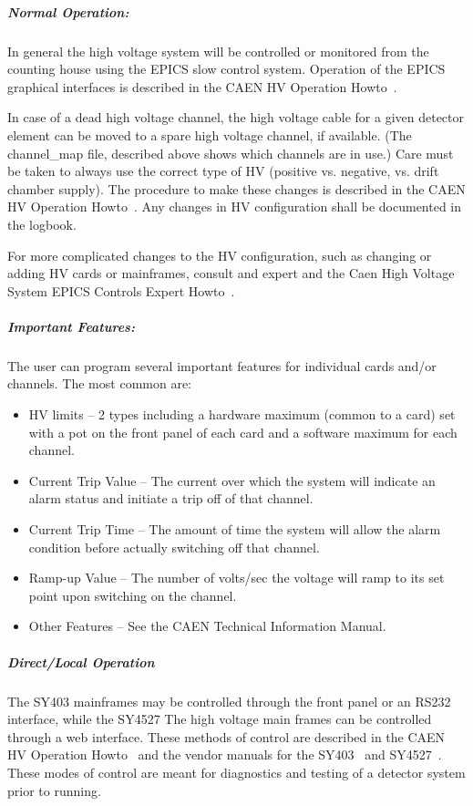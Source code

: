 {\subparagraph{Normal Operation:}

In general the high voltage system will be controlled or monitored
from the counting house using the EPICS slow control system.
Operation of the EPICS graphical interfaces is described in the CAEN
HV Operation Howto~\cite{howto:CAEN_HV_operation}.

In case of a dead high voltage channel, the high voltage cable for a
given detector element can be moved
to a spare high voltage channel, if available.  (The channel\_map
file, described above shows which channels are in use.)  Care must be
taken to always use the correct type of HV (positive vs. negative,
vs. drift chamber supply).  The procedure to make these changes is
described in the CAEN HV Operation
Howto~\cite{howto:CAEN_HV_operation}.  Any changes in HV configuration
shall be documented in the logbook.

For more complicated changes to the HV configuration, such as changing or
adding HV cards or mainframes, consult and expert and the Caen High
Voltage System EPICS Controls Expert Howto~\cite{howto:CAEN_HV_expert}.

\subparagraph{Important Features:}

The user can program several important features for individual
cards and/or channels.  The most common are:

\begin{itemize}
\item{HV limits -- 2 types including a hardware maximum (common to a
card) set with a pot on the front panel of each card and a software
maximum for each channel.}
\item{Current Trip Value -- The current over which the system will
indicate an alarm status and initiate a trip off of that channel.}
\item{Current Trip Time -- The amount of time the system will allow
the alarm condition before actually switching off that channel.}
\item{Ramp-up Value -- The number of volts/sec the voltage will ramp
to its set point upon switching on the channel.}
\item{Other Features -- See the CAEN Technical Information Manual.}
\end{itemize}

\subparagraph{Direct/Local Operation}
The SY403 mainframes may be controlled through the front panel or an
RS232 interface, while the SY4527 The high voltage main frames can be
controlled through a web interface.   These methods of control are
described in the CAEN HV Operation
Howto~\cite{howto:CAEN_HV_operation} and the vendor manuals for the
SY403~\cite{caensy403manual} and SY4527~\cite{caensy4527manual}.
These modes of control are meant for
diagnostics and testing of a detector system prior to running.

}
